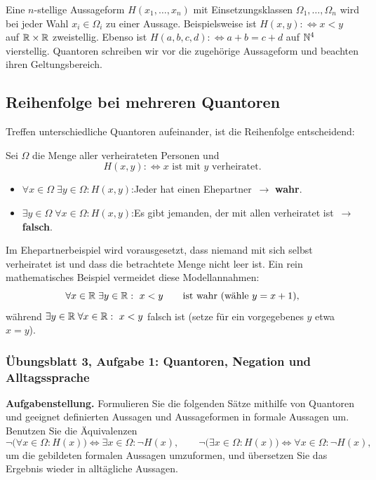 \begin{definition}
Eine $n$-stellige Aussageform $H(x_1,\ldots,x_n)$ mit Einsetzungsklassen
$\Omega_1,\ldots,\Omega_n$ wird bei jeder Wahl $x_i\in\Omega_i$ zu einer
Aussage. Beispielsweise ist $H(x,y):\Longleftrightarrow x<y$ auf
$\mathbb{R}\times\mathbb{R}$ zweistellig. Ebenso ist
$H(a,b,c,d):\Longleftrightarrow a+b=c+d$ auf $\mathbb{N}^4$ vierstellig.
Quantoren schreiben wir vor die zugehörige Aussageform und beachten ihren
Geltungsbereich.
\end{definition}

\subsection*{Reihenfolge bei mehreren Quantoren}
Treffen unterschiedliche Quantoren aufeinander, ist die Reihenfolge entscheidend:
\begin{beispiel}
Sei $\Omega$ die Menge aller verheirateten Personen und
\[
H(x, y) :\Longleftrightarrow x \text{ ist mit } y \text{ verheiratet}.
\]
\begin{itemize}
    \item $\forall x \in \Omega \; \exists y \in \Omega : H(x, y)$:\enspace \glqq Jeder hat einen Ehepartner\grqq\ $\rightarrow$ \textbf{wahr}.
    \item $\exists y \in \Omega \; \forall x \in \Omega : H(x, y)$:\enspace \glqq Es gibt jemanden, der mit allen verheiratet ist\grqq\ $\rightarrow$ \textbf{falsch}.
\end{itemize}
\end{beispiel}
Im Ehepartnerbeispiel wird vorausgesetzt, dass niemand mit sich selbst
verheiratet ist und dass die betrachtete Menge nicht leer ist.
Ein rein mathematisches Beispiel vermeidet diese Modellannahmen:
\[
\forall x\in\mathbb{R}\;\exists y\in\mathbb{R}:\ x<y
\qquad\text{ist wahr (wähle $y=x+1$),}
\]
während $\exists y\in\mathbb{R}\;\forall x\in\mathbb{R}:\ x<y$ falsch ist
(setze für ein vorgegebenes $y$ etwa $x=y$).

\subsubsection*{Übungsblatt 3, Aufgabe 1: Quantoren, Negation und Alltagssprache}

\noindent\textbf{Aufgabenstellung.}
Formulieren Sie die folgenden Sätze mithilfe von Quantoren und geeignet definierten Aussagen und Aussageformen in formale Aussagen um. Benutzen Sie die Äquivalenzen
\[
    \neg\bigl(\forall x\in\Omega : H(x)\bigr) \iff \exists x\in\Omega : \neg H(x),
    \qquad
    \neg\bigl(\exists x\in\Omega : H(x)\bigr) \iff \forall x\in\Omega : \neg H(x),
\]
um die gebildeten formalen Aussagen umzuformen, und übersetzen Sie das Ergebnis wieder in alltägliche Aussagen.

